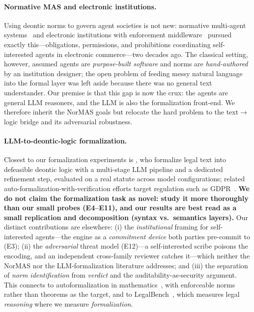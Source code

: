 \paragraph{Normative MAS and electronic institutions.} Using deontic norms to govern agent
societies is not new: normative multi-agent systems~\citep{boella2006normative} and electronic
institutions with enforcement middleware~\citep{esteva2004ameli} pursued exactly this---obligations,
permissions, and prohibitions coordinating self-interested agents in electronic commerce---two
decades ago. The classical setting, however, assumed agents are \emph{purpose-built software} and
norms are \emph{hand-authored} by an institution designer; the open problem of feeding messy
natural language into the formal layer was left aside because there was no general text understander.
Our premise is that this gap is now the crux: the agents are general LLM reasoners, and the LLM is
also the formalization front-end. We therefore inherit the NorMAS goals but relocate the hard
problem to the text$\rightarrow$logic bridge and its adversarial robustness.

\paragraph{LLM-to-deontic-logic formalization.} Closest to our formalization experiments is
\citet{horner2025robust}, who formalize legal text into defeasible deontic logic with a multi-stage
LLM pipeline and a dedicated refinement step, evaluated on a real statute across model
configurations; related auto-formalization-with-verification efforts target regulation such as
GDPR~\citep{nguyen2026gdpr}. \textbf{We do not claim the formalization task as novel: \citet{horner2025robust}
study it more thoroughly than our small probes (E4--E11), and our results are best read as a
small replication and decomposition (syntax vs.\ semantics layers).} Our distinct contributions are
elsewhere: (i) the \emph{institutional} framing for self-interested agents---the engine as a
\emph{commitment device} both parties pre-commit to (E3); (ii) the \emph{adversarial} threat model
(E12)---a self-interested scribe poisons the encoding, and an independent cross-family reviewer
catches it---which neither the NorMAS nor the LLM-formalization literature addresses; and (iii) the
separation of \emph{norm identification} from \emph{verdict} and the auditability-as-security
argument. This connects to autoformalization in mathematics~\citep{wu2022autoformalization}, with
enforceable norms rather than theorems as the target, and to LegalBench~\citep{guha2023legalbench},
which measures legal \emph{reasoning} where we measure \emph{formalization}.


